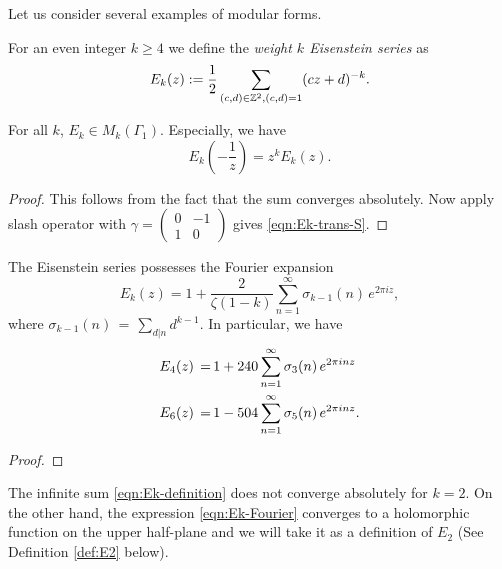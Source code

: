 Let us consider several examples of modular forms.
\begin{definition}\label{def:Ek} 
For an even integer $k\geq 4$ we define the \emph{weight $k$ Eisenstein series} as
\begin{equation}\label{eqn:Ek-definition}
E_k(z):=\frac{1}{2}\sum_{(c,d)\in\mathbb{Z}^2, (c,d)=1}(cz+d)^{-k}.\end{equation}
\end{definition}
\begin{lemma}\label{lemma:Ek-is-modular-form}
For all $k$, $E_k\in M_k(\Gamma_1)$.
Especially, we have
\begin{equation}\label{eqn:Ek-trans-S}
    E_k \left(-\frac{1}{z}\right) = z^k E_k(z).
\end{equation}
\end{lemma}
\begin{proof}
    \leanok
This follows from the fact that the sum converges absolutely.
Now apply slash operator with $\gamma = \left(\begin{smallmatrix} 0 & -1 \\ 1 & 0 \end{smallmatrix}\right)$ gives \eqref{eqn:Ek-trans-S}.
\end{proof}

\begin{lemma}\label{lemma:Ek-Fourier}\leanok
The Eisenstein series possesses the Fourier expansion
\begin{equation}\label{eqn:Ek-Fourier}E_k(z)=1+\frac{2}{\zeta(1-k)}\sum_{n=1}^\infty \sigma_{k-1}(n)\,e^{2\pi i z}, \end{equation}
where $\sigma_{k-1}(n)\,=\,\sum_{d|n} d^{k-1}$. In particular, we have
\begin{align}
  E_4(z)\,=\,& 1+240\sum_{n=1}^\infty \sigma_3(n)\,e^{2\pi i n z} \notag \\
  E_6(z)\,=\,& 1-504\sum_{n=1}^\infty \sigma_5(n)\,e^{2\pi i n z}. \notag
\end{align}
\end{lemma}

\begin{proof}
\leanok
\end{proof}

The infinite sum \eqref{eqn:Ek-definition} does not converge absolutely for $k=2$.
On the other hand, the expression \eqref{eqn:Ek-Fourier} converges to a holomorphic function on the upper half-plane and we will take it as a definition of $E_2$ (See Definition \ref{def:E2} below).


